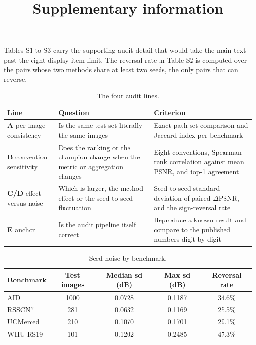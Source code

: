 \documentclass[pdflatex,sn-nature]{sn-jnl}
\newlength{\tblavail}
\begin{document}
\title[Supplementary information]{Supplementary information}
\author*[1]{}\affil*[1]{}
\renewcommand{\thetable}{S\arabic{table}}
\maketitle


Tables S1 to S3 carry the supporting audit detail that would take the main text past the eight-display-item limit. The reversal rate in Table S2 is computed over the pairs whose two methods share at least two seeds, the only pairs that can reverse.

\begin{table}[htbp]
\centering
\small
\setlength{\tabcolsep}{3pt}
\setlength{\tblavail}{\dimexpr\textwidth-6\tabcolsep\relax}
\begin{tabular}{p{0.165\tblavail}p{0.390\tblavail}p{0.415\tblavail}}
\hline
Line & Question & Criterion \\
\hline
\textbf{A} per-image consistency & Is the same test set literally the same images & Exact path-set comparison and Jaccard index per benchmark \\
\textbf{B} convention sensitivity & Does the ranking or the champion change when the metric or aggregation changes & Eight conventions, Spearman rank correlation against mean PSNR, and top-1 agreement \\
\textbf{C/D} effect versus noise & Which is larger, the method effect or the seed-to-seed fluctuation & Seed-to-seed standard deviation of paired $\Delta$PSNR, and the sign-reversal rate \\
\textbf{E} anchor & Is the audit pipeline itself correct & Reproduce a known result and compare to the published numbers digit by digit \\
\hline
\end{tabular}
\caption{The four audit lines.}\label{tab:lines}
\end{table}

\begin{table}[htbp]
\centering
\small
\setlength{\tabcolsep}{3pt}
\setlength{\tblavail}{\dimexpr\textwidth-10\tabcolsep\relax}
\begin{tabular}{lcccc}
\hline
Benchmark & Test images & Median sd (dB) & Max sd (dB) & Reversal rate \\
\hline
AID & 1000 & 0.0728 & 0.1187 & 34.6\% \\
RSSCN7 & 281 & 0.0632 & 0.1169 & 25.5\% \\
UCMerced & 210 & 0.1070 & 0.1701 & 29.1\% \\
WHU-RS19 & 101 & 0.1202 & 0.2485 & 47.3\% \\
\hline
\end{tabular}
\caption{Seed noise by benchmark.}\label{tab:seednoise}
\end{table}
\end{document}
